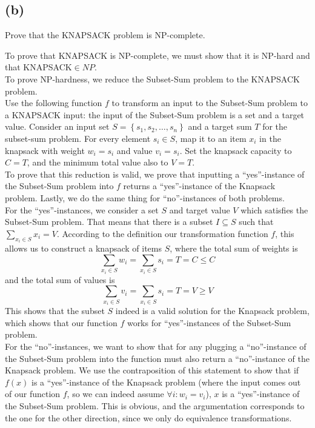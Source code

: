 \subsection{(b)}

Prove that the \textsc{KNAPSACK} problem is \textsc{NP}-complete.

To prove that \textsc{KNAPSACK} is \textsc{NP}-complete, we must show that it is \textsc{NP}-hard and that \textsc{KNAPSACK}$\in NP$.\\
To prove \textsc{NP}-hardness, we reduce the Subset-Sum problem to the \textsc{KNAPSACK} problem.\\
Use the following function $f$ to transform an input to the Subset-Sum problem to a \textsc{KNAPSACK} input: the input of the Subset-Sum problem is a set and a target value. Consider an input set $S = \left\{s_{1},s_{2},\ldots,s_{n}\right\}$ and a target sum $T$ for the subset-sum problem. For every element $s_{i}\in S$, map it to an item $x_{i}$ in the knapsack with weight $w_{i} = s_{i}$ and value $v_{i} = s_{i}$. Set the knapsack capacity to $C = T$, and the minimum total value also to $V = T$.\\
To prove that this reduction is valid, we prove that inputting a ``yes''-instance of the Subset-Sum problem into $f$ returns a ``yes''-instance of the Knapsack problem. Lastly, we do the same thing for ``no''-instances of both problems.\\
For the ``yes''-instances, we consider a set $S$ and target value $V$ which satisfies the Subset-Sum problem. That means that there is a subset $I\subseteq S$ such that $\sum_{x_{i}\in S}x_{i} = V$. According to the definition our transformation function $f$, this allows us to construct a knapsack of items $S$, where the total sum of weights is $$\sum_{x_{i}\in S}w_{i} = \sum_{x_{i}\in S} s_{i} = T = C \leq C$$ and the total sum of values is $$\sum_{x_{i}\in S}v_{i} = \sum_{x_{i}\in S} s_{i} = T = V \geq V$$
This shows that the subset $S$ indeed is a valid solution for the Knapsack problem, which shows that our function $f$ works for ``yes''-instances of the Subset-Sum problem.\\
For the ``no''-instances, we want to show that for any plugging a ``no''-instance of the Subset-Sum problem into the function must also return a ``no''-instance of the Knapsack problem. We use the contraposition of this statement to show that if $f(x)$ is a ``yes''-instance of the Knapsack problem (where the input comes out of our function $f$, so we can indeed assume $\forall i: w_{i} = v_{i}$), $x$ is a ``yes''-instance of the Subset-Sum problem. This is obvious, and the argumentation corresponds to the one for the other direction, since we only do equivalence transformations.

